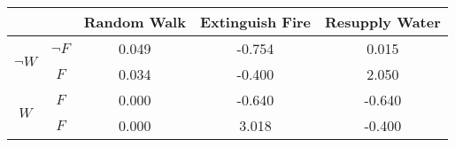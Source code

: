 \begin{center}
\begin{tabular}{|c|c|c|c|c|}
  \hline
  &   & Random Walk & Extinguish Fire & Resupply Water\\
  \hline
  \multirow{2}{*}{$\neg W$} & $\neg F$ & 0.049 & -0.754 & 0.015\\
  \cline{2-5}
   & $F$ & 0.034 & -0.400 & 2.050\\
  \hline
  \multirow{2}{*}{$W$} & $F$ & 0.000 & -0.640 & -0.640\\
  \cline{2-5}
   & $F$ & 0.000 & 3.018 & -0.400\\
  \hline
\end{tabular}
\end{center}
